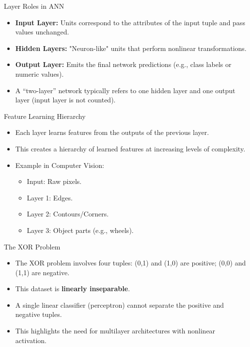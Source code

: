 \documentclass[aspectratio=169]{beamer}
\begin{document}
\begin{frame}{Layer Roles in ANN}
    \begin{itemize}
        \item \textbf{Input Layer:} Units correspond to the attributes of the input tuple and pass values unchanged.
        \item \textbf{Hidden Layers:} "Neuron-like" units that perform nonlinear transformations.
        \item \textbf{Output Layer:} Emits the final network predictions (e.g., class labels or numeric values).
        \item A ``two-layer'' network typically refers to one hidden layer and one output layer (input layer is not counted).
    \end{itemize}
\end{frame}

\begin{frame}{Feature Learning Hierarchy}
    \begin{itemize}
        \item Each layer learns features from the outputs of the previous layer.
        \item This creates a hierarchy of learned features at increasing levels of complexity.
        \item Example in Computer Vision:
        \begin{itemize}
            \item Input: Raw pixels.
            \item Layer 1: Edges.
            \item Layer 2: Contours/Corners.
            \item Layer 3: Object parts (e.g., wheels).
        \end{itemize}
    \end{itemize}
\end{frame}

\begin{frame}{The XOR Problem}
    \begin{itemize}
        \item The XOR problem involves four tuples: (0,1) and (1,0) are positive; (0,0) and (1,1) are negative.
        \item This dataset is \textbf{linearly inseparable}.
        \item A single linear classifier (perceptron) cannot separate the positive and negative tuples.
        \item This highlights the need for multilayer architectures with nonlinear activation.
    \end{itemize}
\end{frame}
\end{document}
